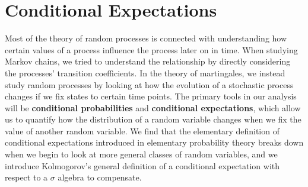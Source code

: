 \chapter{Conditional Expectations}

Most of the theory of random processes is connected with understanding how certain values of a process influence the process later on in time. When studying Markov chains, we tried to understand the relationship by directly considering the processes' transition coefficients. In the theory of martingales, we instead study random processes by looking at how the evolution of a stochastic process changes if we fix states to certain time points. The primary tools in our analysis will be {\bf conditional probabilities} and {\bf conditional expectations}, which allow us to quantify how the distribution of a random variable changes when we fix the value of another random variable. We find that the elementary definition of conditional expectations introduced in elementary probability theory breaks down when we begin to look at more general classes of random variables, and we introduce Kolmogorov's general definition of a conditional expectation with respect to a $\sigma$ algebra to compensate.


